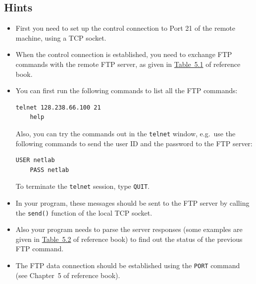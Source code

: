 \documentclass{UTNetLab}
\begin{document}
    \subsection*{Hints}
    \begin{itemize}
        \item First you need to set up the control connection to Port 21 of the remote machine, using a TCP socket.
        \item When the control connection is established, you need to exchange FTP commands with the remote FTP server, as given in \hyperref[tab:5.1]{Table~5.1} of reference book.
        \item You can first run the following commands to list all the FTP commands:
        
        \begin{lstlisting}[xleftmargin=0.05in]
    telnet 128.238.66.100 21
    help
    \end{lstlisting}
        
    Also, you can try the commands out in the \lstinline{telnet} window, e.g.\ use the following commands to send the user ID and the password to the FTP server:
        
        \begin{lstlisting}[xleftmargin=0.05in]
    USER netlab
    PASS netlab
    \end{lstlisting}
        
        To terminate the \lstinline{telnet} session, type \lstinline{QUIT}.
        \item In your program, these messages should be sent to the FTP server by calling the \lstinline{send()} function of the local TCP socket.
        \item Also your program needs to parse the server responses (some examples are given in \hyperref[tab:5.2]{Table~5.2} of reference book) to find out the status of the previous FTP command.
        \item The FTP data connection should be established using the \lstinline{PORT} command (see Chapter~5 of reference book).
    \end{itemize}
\end{document}
